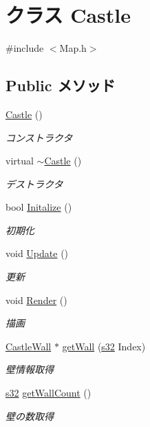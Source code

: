 \hypertarget{class_castle}{\section{クラス Castle}
\label{class_castle}
}


{\ttfamily \#include $<$Map.\-h$>$}

\subsection*{Public メソッド}
\begin{DoxyCompactItemize}
\item 
\hyperlink{class_castle_ab5a57307b5e4c8ecb6f8f0524684e6d6}{Castle} ()
\begin{DoxyCompactList}\small\item\em コンストラクタ \end{DoxyCompactList}\item 
virtual \hyperlink{class_castle_ae9c1fceaa18364fec63a60856263cf54}{$\sim$\-Castle} ()
\begin{DoxyCompactList}\small\item\em デストラクタ \end{DoxyCompactList}\item 
bool \hyperlink{class_castle_ac51a560d2d81e39566b0cb425a3425b3}{Initalize} ()
\begin{DoxyCompactList}\small\item\em 初期化 \end{DoxyCompactList}\item 
void \hyperlink{class_castle_af92ca7a0fff116f19d38cd1c2a16415b}{Update} ()
\begin{DoxyCompactList}\small\item\em 更新 \end{DoxyCompactList}\item 
void \hyperlink{class_castle_acf75119d84b6058a048f8a2ce95c4abf}{Render} ()
\begin{DoxyCompactList}\small\item\em 描画 \end{DoxyCompactList}\item 
\hyperlink{class_castle_wall}{Castle\-Wall} $\ast$ \hyperlink{class_castle_aa92557c6b84a7c94895290232e2d88e0}{get\-Wall} (\hyperlink{_main_8h_a0ce6887c26c1c49ad3be5710dd42bfd6}{s32} Index)
\begin{DoxyCompactList}\small\item\em 壁情報取得 \end{DoxyCompactList}\item 
\hyperlink{_main_8h_a0ce6887c26c1c49ad3be5710dd42bfd6}{s32} \hyperlink{class_castle_a6b17d49d82f4a49f8b8a124492b59102}{get\-Wall\-Count} ()
\begin{DoxyCompactList}\small\item\em 壁の数取得 \end{DoxyCompactList}\end{DoxyCompactItemize}
